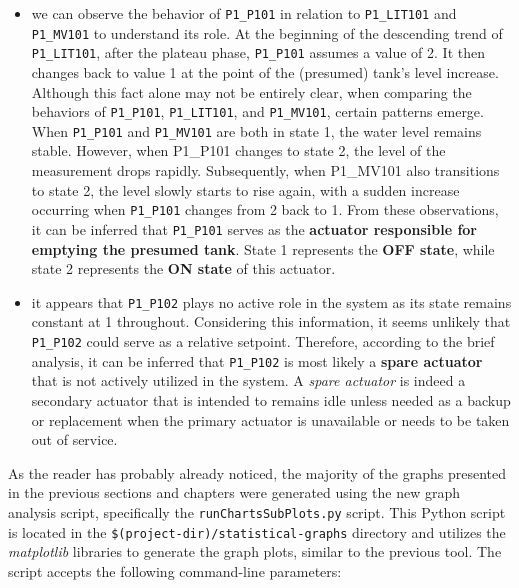 \begin{itemize}
	\item we can observe the behavior of \texttt{P1\_P101} in relation to \texttt{P1\_LIT101} and \texttt{P1\_MV101} to understand its role. At the beginning of the descending trend of \texttt{P1\_LIT101}, after the plateau phase, \texttt{P1\_P101} assumes a value of 2. It then changes back to value 1 at the point of the (presumed) tank's level increase. Although this fact alone may not be entirely clear, when comparing the behaviors of \texttt{P1\_P101}, \texttt{P1\_LIT101}, and \texttt{P1\_MV101}, certain patterns emerge. When \texttt{P1\_P101} and \texttt{P1\_MV101} are both in state 1, the water level remains stable. However, when P1\_P101 changes to state 2, the level of the measurement drops rapidly. Subsequently, when P1\_MV101 also transitions to state 2, the level slowly starts to rise again, with a sudden increase occurring when \texttt{P1\_P101} changes from 2 back to 1. From these observations, it can be inferred that \texttt{P1\_P101} serves as the \textbf{actuator responsible for emptying the presumed tank}. State 1 represents the \textbf{OFF state}, while state 2 represents the \textbf{ON state} of this actuator.
	
	\item it appears that \texttt{P1\_P102} plays no active role in the system as its state remains constant at 1 throughout. Considering this information, it seems unlikely that \texttt{P1\_P102} could serve as a relative setpoint. Therefore, according to the brief analysis, it can be inferred that \texttt{P1\_P102} is most likely a \textbf{spare actuator} that is not actively utilized in the system. A \textit{spare actuator} is indeed a secondary actuator that is intended to remains idle unless needed as a backup or replacement when the primary actuator is unavailable or needs to be taken out of service.
\end{itemize}

\bigskip
As the reader has probably already noticed, the majority of the graphs presented in the previous sections and chapters were generated using the new graph analysis script, specifically the \texttt{runChartsSubPlots.py} script. This Python script is located in the \texttt{\$(project-dir)/statistical-graphs} directory and utilizes the \textit{matplotlib} libraries to generate the graph plots, similar to the previous tool.\newline 
The script accepts the following command-line parameters:

